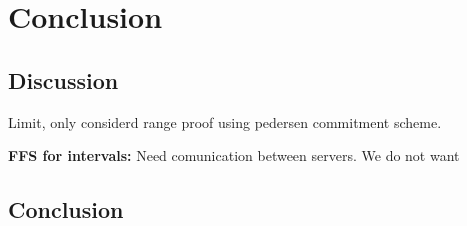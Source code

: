 \chapter{Conclusion}

\section{Discussion}
Limit, only considerd range proof using pedersen commitment scheme.


\textbf{FFS for intervals: }Need comunication between servers. We do not want 
\section{Conclusion}
